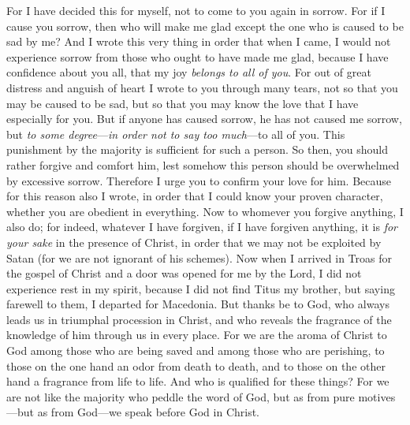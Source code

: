 \begin{biblechapter} %
\verse For I have decided this for myself, not to come to you again in sorrow.
\verse For if I cause you sorrow, then who will make me glad except the one who is caused to be sad by me?
\verse And I wrote this very thing in order that when I came, I would not experience sorrow from those who ought to have made me glad, because I have confidence about you all, that my joy \textit{belongs to all of you}.
\verse For out of great distress and anguish of heart I wrote to you through many tears, not so that you may be caused to be sad, but so that you may know the love that I have especially for you.
 But if anyone has caused sorrow, he has not caused me sorrow, but \textit{to some degree}—\textit{in order not to say too much}—to all of you.
\verse This punishment by the majority is sufficient for such a person.
\verse So then, you should rather forgive and comfort him, lest somehow this person should be overwhelmed by excessive sorrow.
\verse Therefore I urge you to confirm your love for him.
\verse Because for this reason also I wrote, in order that I could know your proven character, whether you are obedient in everything.
\verse Now to whomever you forgive anything, I also do; for indeed, whatever I have forgiven, if I have forgiven anything, it is \textit{for your sake} in the presence of Christ,
\verse in order that we may not be exploited by Satan (for we are not ignorant of his schemes).
 Now when I arrived in Troas for the gospel of Christ and a door was opened for me by the Lord,
\verse I did not experience rest in my spirit, because I did not find Titus my brother, but saying farewell to them, I departed for Macedonia.
\verse But thanks be to God, who always leads us in triumphal procession in Christ, and who reveals the fragrance of the knowledge of him through us in every place.
\verse For we are the aroma of Christ to God among those who are being saved and among those who are perishing,
\verse to those on the one hand an odor from death to death, and to those on the other hand a fragrance from life to life. And who is qualified for these things?
\verse For we are not like the majority who peddle the word of God, but as from pure motives—but as from God—we speak before God in Christ.
\end{biblechapter}

